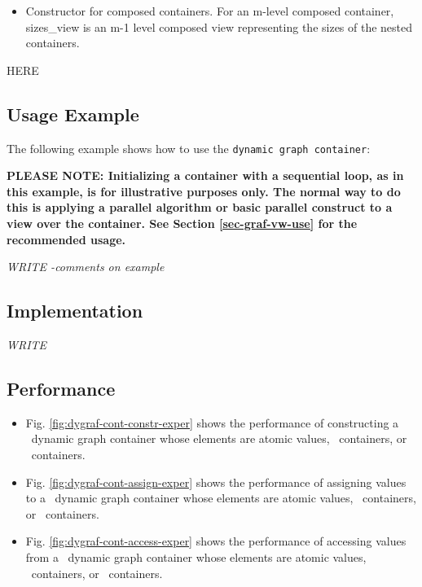 \begin{itemize}
\item
Constructor for composed containers. For an m-level composed container, sizes\_view is an m-1 level composed view representing the sizes of the nested containers. 
\end{itemize}

HERE

\subsection{Usage Example} \label{sec-dygraf-cont-use}

The following example shows how to use the \texttt{dynamic graph container}:


\textbf{PLEASE NOTE: 
Initializing a container with a sequential loop, as in this example,
is for illustrative purposes only.
The normal way to do this is applying a parallel algorithm or 
basic parallel construct to a view over the container.  See Section
\ref{sec-graf-vw-use}
for the recommended usage.
}

\vspace{0.4cm} \textit{WRITE -comments on example}

\subsection{Implementation} \label{sec-dygraf-cont-impl}

\textit{WRITE}

\subsection{Performance} \label{sec-dygraf-cont-perf}

\begin{itemize}
\item
Fig. \ref{fig:dygraf-cont-constr-exper}
shows the performance of constructing a \stapl\ dynamic graph container
whose elements are atomic values, \stl\ containers, or \stapl\ containers.
\item
Fig. \ref{fig:dygraf-cont-assign-exper}
shows the performance of assigning values to a \stapl\ dynamic graph container
whose elements are atomic values, \stl\ containers, or \stapl\ containers.
\item
Fig. \ref{fig:dygraf-cont-access-exper}
shows the performance of accessing values from a \stapl\ dynamic graph container
whose elements are atomic values, \stl\ containers, or \stapl\ containers.
\end{itemize}

